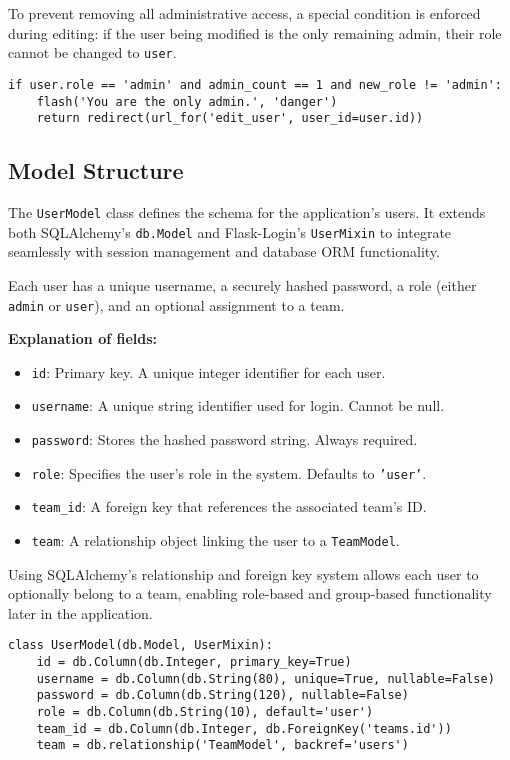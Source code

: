 \documentclass[12pt]{article}
\begin{document}
To prevent removing all administrative access, a special condition is enforced during editing: if the user being modified is the only remaining admin, their role cannot be changed to \texttt{user}.

\begin{verbatim}
if user.role == 'admin' and admin_count == 1 and new_role != 'admin':
    flash('You are the only admin.', 'danger')
    return redirect(url_for('edit_user', user_id=user.id))
\end{verbatim}


\subsection{Model Structure}

The \texttt{UserModel} class defines the schema for the application's users. It extends both SQLAlchemy’s \texttt{db.Model} and Flask-Login’s \texttt{UserMixin} to integrate seamlessly with session management and database ORM functionality.

Each user has a unique username, a securely hashed password, a role (either \texttt{admin} or \texttt{user}), and an optional assignment to a team.

\textbf{Explanation of fields:}
\begin{itemize}
  \item \texttt{id}: Primary key. A unique integer identifier for each user.
  \item \texttt{username}: A unique string identifier used for login. Cannot be null.
  \item \texttt{password}: Stores the hashed password string. Always required.
  \item \texttt{role}: Specifies the user's role in the system. Defaults to \texttt{'user'}.
  \item \texttt{team\_id}: A foreign key that references the associated team’s ID.
  \item \texttt{team}: A relationship object linking the user to a \texttt{TeamModel}.
\end{itemize}

\noindent Using SQLAlchemy’s relationship and foreign key system allows each user to optionally belong to a team, enabling role-based and group-based functionality later in the application.

\begin{verbatim}
class UserModel(db.Model, UserMixin):
    id = db.Column(db.Integer, primary_key=True) 
    username = db.Column(db.String(80), unique=True, nullable=False) 
    password = db.Column(db.String(120), nullable=False)  
    role = db.Column(db.String(10), default='user') 
    team_id = db.Column(db.Integer, db.ForeignKey('teams.id')) 
    team = db.relationship('TeamModel', backref='users') 
\end{verbatim}
\end{document}
